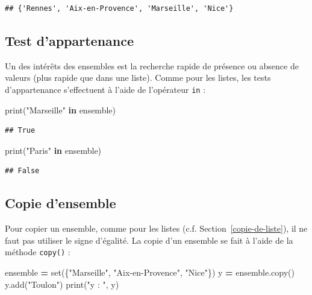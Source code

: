 \documentclass[12pt,]{book}
\newenvironment{Shaded}{\begin{snugshade}}{\end{snugshade}}
\newcommand{\KeywordTok}[1]{\textcolor[rgb]{0.13,0.29,0.53}{\textbf{#1}}}
\newcommand{\StringTok}[1]{\textcolor[rgb]{0.31,0.60,0.02}{#1}}
\newcommand{\OperatorTok}[1]{\textcolor[rgb]{0.81,0.36,0.00}{\textbf{#1}}}
\newcommand{\BuiltInTok}[1]{#1}
\newcommand{\NormalTok}[1]{#1}
\numberwithin{equation}{section}
\numberwithin{countremarque}{section}
\begin{document}
\begin{lstlisting}
## {'Rennes', 'Aix-en-Provence', 'Marseille', 'Nice'}
\end{lstlisting}

\subsection{Test d'appartenance}\label{test-dappartenance-1}

Un des intérêts des ensembles est la recherche rapide de présence ou
absence de valeurs (plus rapide que dans une liste). Comme pour les
listes, les tests d'appartenance s'effectuent à l'aide de l'opérateur
\texttt{in} :

\begin{Shaded}
\begin{Highlighting}[]
\BuiltInTok{print}\NormalTok{(}\StringTok{"Marseille"} \KeywordTok{in}\NormalTok{ ensemble)}
\end{Highlighting}
\end{Shaded}

\begin{lstlisting}
## True
\end{lstlisting}

\begin{Shaded}
\begin{Highlighting}[]
\BuiltInTok{print}\NormalTok{(}\StringTok{"Paris"} \KeywordTok{in}\NormalTok{ ensemble)}
\end{Highlighting}
\end{Shaded}

\begin{lstlisting}
## False
\end{lstlisting}

\subsection{Copie d'ensemble}\label{copie-densemble}

Pour copier un ensemble, comme pour les listes (c.f.
Section~\ref{copie-de-liste}), il ne faut pas utiliser le signe
d'égalité. La copie d'un ensemble se fait à l'aide de la méthode
\texttt{copy()} :

\begin{Shaded}
\begin{Highlighting}[]
\NormalTok{ensemble }\OperatorTok{=} \BuiltInTok{set}\NormalTok{(\{}\StringTok{"Marseille"}\NormalTok{, }\StringTok{"Aix-en-Provence"}\NormalTok{, }\StringTok{"Nice"}\NormalTok{\})}
\NormalTok{y }\OperatorTok{=}\NormalTok{ ensemble.copy()}
\NormalTok{y.add(}\StringTok{"Toulon"}\NormalTok{)}
\BuiltInTok{print}\NormalTok{(}\StringTok{"y : "}\NormalTok{, y)}
\end{Highlighting}
\end{Shaded}
\end{document}
